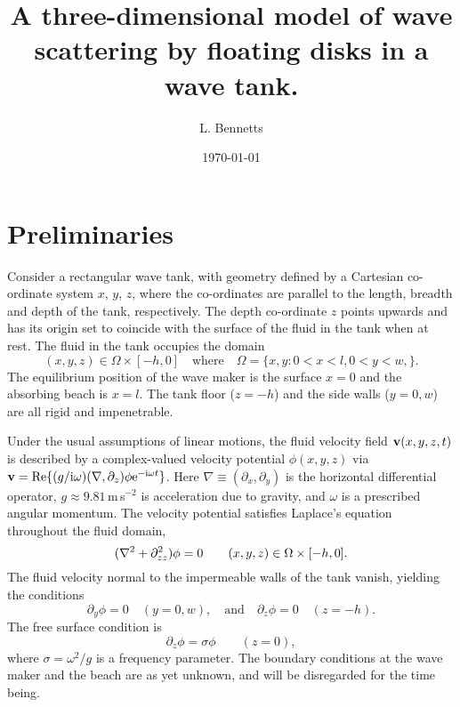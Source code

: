 \documentclass[12pt,a4paper]{article}
\newcommand{\dom}{\Omega }
\newcommand{\bv}{{\bf v}}
\newcommand{\vp}{{\phi}}
\newcommand{\fp}{{\sigma}}
\begin{document}
\title{A three-dimensional model of wave scattering by floating disks in a wave tank.}
\author{L. Bennetts}
\date{\today}
\maketitle

\section{Preliminaries}

Consider a rectangular wave tank, with geometry defined by a Cartesian co-ordinate system $x$, $y$, $z$, where the co-ordinates are parallel to the length, breadth and depth of the tank, respectively.
The depth co-ordinate $z$ points upwards and has its origin set to coincide with the surface of the fluid in the tank when at rest. 
The fluid in the tank occupies the domain
\begin{equation}
(x,y,z)\in 
\dom\times[-h,0]
\quad
\text{where}
\quad
\Omega
=
\{
x,y:
0<x<l,
0<y<w,
\}.
\end{equation}
The equilibrium position of the wave maker is the surface $x=0$ and the absorbing beach is $x=l$.
The tank floor ($z=-h$) and the side walls ($y=0,w$) are all rigid and impenetrable. 

Under the usual assumptions of linear motions, the fluid velocity field $\bv(x,y,z,t)$ is described by a complex-valued velocity potential $\vp(x,y,z)$ via $\bv=\real\{(g/\ci\omega)(\nabla,\partial_{z})\vp\exp^{-\ci\omega t}\}$.
Here $\nabla\equiv(\partial_{x},\partial_{y})$ is the horizontal differential operator, $g\approx 9.81$\,m\,s$^{-2}$ is acceleration due to gravity, and $\omega$ is a prescribed angular momentum.
The velocity potential satisfies Laplace's equation throughout the  fluid domain, \ie
\begin{equation}
(\lap+\partial^2_{zz})
\vp
=
0
\qquad
(x,y,z)\in\dom\times[-h,0].
\end{equation}
The fluid velocity normal to the impermeable walls of the tank vanish, yielding the conditions
\begin{equation}
\partial_{y}\vp = 0
\quad
(y=0,w),
\quad
\text{and}
\quad
\partial_{z}\vp = 0
\quad
(z=-h).
\end{equation}
The free surface condition is
\begin{equation}
\partial_{z}\vp
=
\fp\vp
\qquad
(z=0),
\end{equation}
where $\fp=\omega^{2}/g$ is a frequency parameter.
The boundary conditions at the wave maker and the beach are as yet unknown, and will be disregarded for the time being. 
 
\end{document}
